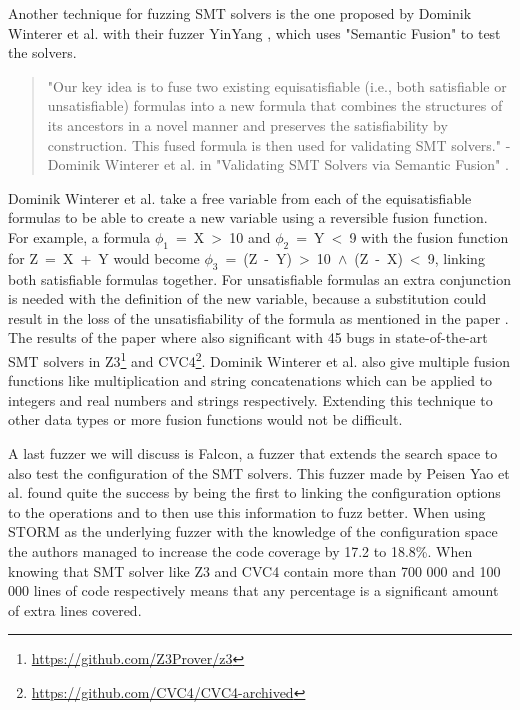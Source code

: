 Another technique for fuzzing SMT solvers is the one proposed by Dominik Winterer et al. with their fuzzer YinYang \cite{43YinYang}, which uses "Semantic Fusion" to test the solvers.
\begin{quote}
	\label{quote:Fuzzing:YinYang}
	"Our key idea is to fuse two existing equisatisfiable (i.e., both satisfiable or unsatisfiable) formulas into a new formula that combines the structures of its ancestors in a novel manner and preserves the satisfiability by construction. This fused formula is then used for validating SMT solvers."
	\newline
	-Dominik Winterer et al. in "Validating SMT Solvers via Semantic Fusion" \cite{43YinYang}.
\end{quote}
Dominik Winterer et al. take a free variable from each of the equisatisfiable formulas to be able to create a new variable using a reversible fusion function. For example, a formula \mbox{$\phi_1$ = X > 10} and \mbox{$\phi_2$ = Y < 9} with the fusion function for \mbox{Z = X + Y} would become \mbox{$\phi_3$ = (Z - Y) > 10 $\land$ (Z - X) < 9}, linking both satisfiable formulas together. For unsatisfiable formulas an extra conjunction is needed with the definition of the new variable, because a substitution could result in the loss of the unsatisfiability of the formula as mentioned in the paper \cite{43YinYang}. The results of the paper where also significant with 45 bugs in state-of-the-art SMT solvers in Z3\footnote{\url{https://github.com/Z3Prover/z3}} and CVC4\footnote{\url{https://github.com/CVC4/CVC4-archived}}. Dominik Winterer et al. also give multiple fusion functions like multiplication and string concatenations which can be applied to integers and real numbers and strings respectively. Extending this technique to other data types or more fusion functions would not be difficult.


A last fuzzer we will discuss is Falcon, a fuzzer that extends the search space to also test the configuration of the SMT solvers. This fuzzer made by Peisen Yao et al. \cite{42FalconFuzzingConfigurationSettingsAndNormal} found quite the success by being the first to linking the configuration options to the operations and to then use this information to fuzz better.
When using STORM as the underlying fuzzer with the knowledge of the configuration space the authors managed to increase the code coverage by 17.2 to 18.8\%. When knowing that SMT solver like Z3 and CVC4 contain more than 700 000 and 100 000 lines of code respectively means that any percentage is a significant amount of extra lines covered.

